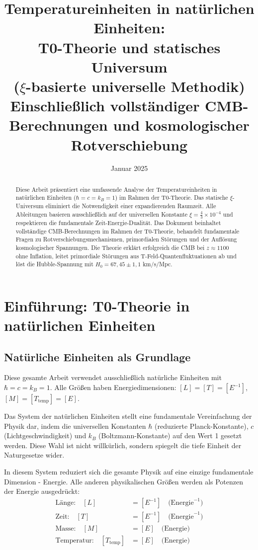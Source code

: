 \documentclass[12pt,a4paper]{article}
\title{Temperatureinheiten in natürlichen Einheiten: \\
		T0-Theorie und statisches Universum \\
		($\xi$-basierte universelle Methodik)\\
		\large Einschließ{}lich vollständiger CMB-Berechnungen und kosmologischer Rotverschiebung}
\author{}
\date{Januar 2025}
\begin{document}
	\maketitle
	
	\begin{abstract}
		Diese Arbeit präsentiert eine umfassende Analyse der Temperatureinheiten in natürlichen Einheiten ($\hbar = c = k_B = 1$) im Rahmen der T0-Theorie. Das statische $\xi$-Universum eliminiert die Notwendigkeit einer expandierenden Raumzeit. Alle Ableitungen basieren ausschließ{}lich auf der universellen Konstante $\xi = \frac{4}{3} \times 10^{-4}$ und respektieren die fundamentale Zeit-Energie-Dualität. Das Dokument beinhaltet vollständige CMB-Berechnungen im Rahmen der T0-Theorie, behandelt fundamentale Fragen zu Rotverschiebungsmechanismen, primordialen Störungen und der Auflösung kosmologischer Spannungen. Die Theorie erklärt erfolgreich die CMB bei $z \approx 1100$ ohne Inflation, leitet primordiale Störungen aus T-Feld-Quantenfluktuationen ab und löst die Hubble-Spannung mit $H_0 = 67,45 \pm 1,1$ km/s/Mpc.
	\end{abstract}
	
	\tableofcontents
	
	\section{Einführung: T0-Theorie in natürlichen Einheiten}
	
	\subsection{Natürliche Einheiten als Grundlage}
	
	\begin{important}
		Diese gesamte Arbeit verwendet ausschließ{}lich natürliche Einheiten mit $\hbar = c = k_B = 1$. Alle Größ{}en haben Energiedimensionen: $[L] = [T] = [E^{-1}]$, $[M] = [T_{\text{temp}}] = [E]$.
	\end{important}
	
	Das System der natürlichen Einheiten stellt eine fundamentale Vereinfachung der Physik dar, indem die universellen Konstanten $\hbar$ (reduzierte Planck-Konstante), $c$ (Lichtgeschwindigkeit) und $k_B$ (Boltzmann-Konstante) auf den Wert 1 gesetzt werden. Diese Wahl ist nicht willkürlich, sondern spiegelt die tiefe Einheit der Naturgesetze wider.
	
	In diesem System reduziert sich die gesamte Physik auf eine einzige fundamentale Dimension - Energie. Alle anderen physikalischen Größ{}en werden als Potenzen der Energie ausgedrückt:
	\begin{align}
		\text{Länge:} \quad [L] &= [E^{-1}] \quad \text{(Energie}^{-1}\text{)} \\
		\text{Zeit:} \quad [T] &= [E^{-1}] \quad \text{(Energie}^{-1}\text{)} \\
		\text{Masse:} \quad [M] &= [E] \quad \text{(Energie)} \\
		\text{Temperatur:} \quad [T_{\text{temp}}] &= [E] \quad \text{(Energie)}
	\end{align}
	
\end{document}
